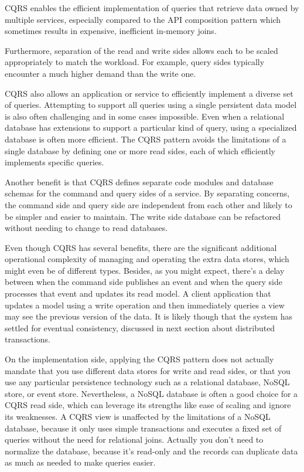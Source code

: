\documentclass[conference]{IEEEtran}
\begin{document}
CQRS enables the efficient implementation of queries that retrieve data owned by multiple services, especially compared to the API composition pattern which sometimes results in expensive, inefficient in-memory joins.

Furthermore, separation of the read and write sides allows each to be scaled appropriately to match the workload. For example, query sides typically encounter a much higher demand than the write one.

CQRS also allows an application or service to efficiently implement a diverse set of queries. Attempting to support all queries using a single persistent data model is also often challenging and in some cases impossible. Even when a relational database has extensions to support a particular kind of query, using a specialized database is often more efficient. The CQRS pattern avoids the limitations of a single database by defining one or more read sides, each of which efficiently implements specific queries.

Another benefit is that CQRS defines separate code modules and database schemas for the command and query sides of a service. By separating concerns, the command side and query side are independent from each other and likely to be simpler and easier to maintain. The write side database can be refactored without needing to change to read databases.

Even though CQRS has several benefits, there are the significant additional operational complexity of managing and operating the extra data stores, which might even be of different types. Besides, as you might expect, there’s a delay between when the command side publishes an event and when the query side processes that event and updates its read model. A client application that updates a model using a write operation and then immediately queries a view may see the previous version of the data. It is likely though that the system has settled for eventual consistency, discussed in next section about distributed transactions.

On the implementation side, applying the CQRS pattern does not actually mandate that you use different data stores for write and read sides, or that you use any particular persistence technology such as a relational database, NoSQL store, or event store. Nevertheless, a NoSQL database is often a good choice for a CQRS read side, which can leverage its strengths like ease of scaling and ignore its weaknesses. A CQRS view is unaffected by the limitations of a NoSQL database, because it only uses simple transactions and executes a fixed set of queries without the need for relational joins. Actually you don't need to normalize the database, because it's read-only and the records can duplicate data as much as needed to make queries easier.
\end{document}
